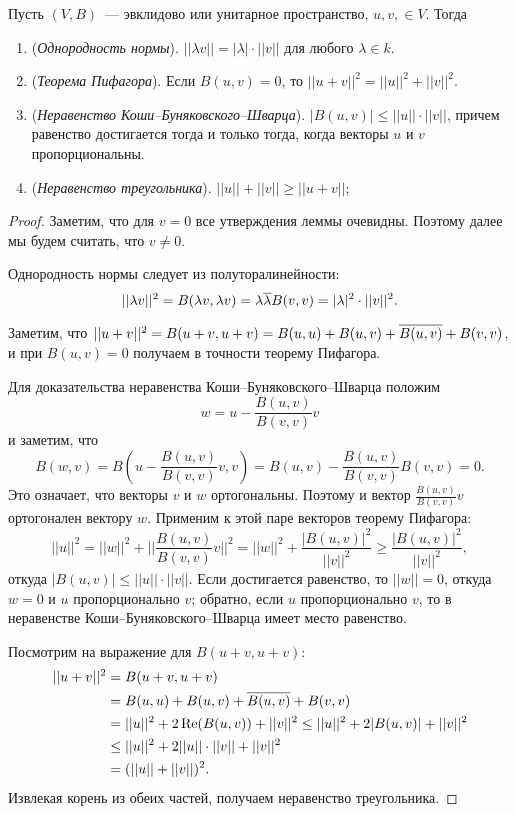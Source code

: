 \begin{lemma}\label{lem:triangle_inequality}
Пусть $(V,B)$~--- эвклидово или унитарное пространство, $u,v,\in V$. Тогда
\begin{enumerate}
\item ({\it Однородность нормы}). $||\lambda v|| = |\lambda|\cdot
  ||v||$ для любого $\lambda\in k$.
\item ({\it Теорема Пифагора}). Если $B(u,v)=0$, то $||u+v||^2 = ||u||^2
  + ||v||^2$.
\item ({\it Неравенство Коши--Буняковского--Шварца}).
$|B(u,v)|\leq ||u||\cdot ||v||$, причем равенство достигается тогда и
только тогда, когда векторы $u$ и $v$ пропорциональны.
\item ({\it Неравенство треугольника}). $||u||+||v||\geq ||u+v||$;
\end{enumerate}
\end{lemma}
\begin{proof}
Заметим, что для $v=0$ все утверждения леммы очевидны. Поэтому далее
мы будем считать, что $v\neq 0$.

Однородность нормы следует из полуторалинейности:
$$
||\lambda v||^2 = B(\lambda v,\lambda v) =
\lambda\overline{\lambda}B(v,v) = |\lambda|^2\cdot ||v||^2.
$$

Заметим, что $||u+v||^2 = B(u+v,u+v) = B(u,u) + B(u,v) +
\overline{B(u,v)} + B(v,v)$, и при $B(u,v)=0$ получаем в точности теорему
Пифагора.

Для доказательства неравенства Коши--Буняковского--Шварца положим
$$
w = u - \frac{B(u,v)}{B(v,v)}v
$$
и заметим, что $$B(w,v) = B(u-\frac{B(u,v)}{B(v,v)}v,v)
 = B(u,v) - \frac{B(u,v)}{B(v,v)}B(v,v) = 0.$$
Это означает, что векторы $v$ и $w$ ортогональны. Поэтому и вектор
$\frac{B(u,v)}{B(v,v)}v$ ортогонален вектору $w$. Применим к этой паре
векторов теорему Пифагора:
$$
||u||^2 = ||w||^2 + ||\frac{B(u,v)}{B(v,v)}v||^2 = ||w||^2 +
\frac{|B(u,v)|^2}{||v||^2} \geq \frac{|B(u,v)|^2}{||v||^2},
$$
откуда $|B(u,v)|\leq ||u||\cdot ||v||$.
Если достигается равенство, то $||w||=0$, откуда $w=0$ и $u$
пропорционально $v$; обратно, если $u$ пропорционально $v$, то
в неравенстве Коши--Буняковского--Шварца имеет место равенство.

Посмотрим на выражение для $B(u+v,u+v)$:
\begin{align*}
||u+v||^2 &= B(u+v,u+v)\\
&= B(u,u) + B(u,v) + \overline{B(u,v)}+ B(v,v)\\
&= ||u||^2 + 2\operatorname{Re}(B(u,v)) + ||v||^2 \leq ||u||^2 + 2|B(u,v)| + ||v||^2\\
&\leq ||u||^2 +2||u||\cdot ||v|| + ||v||^2\\
&= (||u||+||v||)^2.
\end{align*}
Извлекая корень из обеих частей, получаем неравенство треугольника.
\end{proof}

